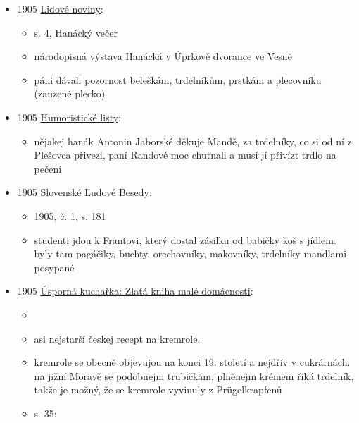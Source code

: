 \begin{itemize}
  \begin{itemize}
  \tightlist
  \item
    etiketa přikazuje matkám, sestrám, kmotrám, tetám, ale můžou i
    kamarádky, nosit šestinedělkám do kouta: 1. zásilka bývá vařená
    slepice, lukšová polívka, koláče, 2. lukšová polívka, hovězí s
    omáčkou, koblihy, víno, 3. smažený kuřata, trdelník nebo boží
    milosti a víno, 4. živá drůbež, syrová káva, bábovka i syrový maso
  \end{itemize}
\item
  1905
  \href{https://ceskadigitalniknihovna.cz/uuid/uuid:b78503e3-435d-11dd-b505-00145e5790ea}{Lidové
  noviny}:

  \begin{itemize}
  \tightlist
  \item
    s. 4, Hanácký večer
  \item
    národopisná výstava Hanácká v Úprkově dvorance ve Vesně
  \item
    páni dávali pozornost beleškám, trdelníkům, prstkám a plecovníku
    (zauzené plecko)
  \end{itemize}
\item
  1905
  \href{https://ceskadigitalniknihovna.cz/uuid/uuid:e6cc2207-435d-11dd-b505-00145e5790ea}{Humoristické
  listy}:

  \begin{itemize}
  \tightlist
  \item
    nějakej hanák Antonin Jaborské děkuje Mandě, za trdelníky, co si od
    ní z Plešovca přivezl, paní Randové moc chutnali a musí jí přivízt
    trdlo na pečení
  \end{itemize}
\item
  1905
  \href{https://dikda.snk.sk/uuid/uuid:f4689941-92c2-4efa-b830-9c02c5e1dbf7}{Slovenské
  Ľudové Besedy}:

  \begin{itemize}
  \tightlist
  \item
    1905, č. 1, s. 181
  \item
    studenti jdou k Frantovi, který dostal zásilku od babičky koš s
    jídlem. byly tam pagáčiky, buchty, orechovníky, makovníky, trdelníky
    mandlami posypané
  \end{itemize}
\item
  1905
  \href{https://ceskadigitalniknihovna.cz/uuid/uuid:92266300-0c11-11ed-9dda-5ef3fc9bb22f}{Úsporná
  kuchařka: Zlatá kniha malé domácnosti}:

  \begin{itemize}
  \tightlist
  \item
  \item
    asi nejstarší českej recept na kremrole.
  \item
    kremrole se obecně objevujou na konci 19. století a nejdřív v
    cukrárnách. na jižní Moravě se podobnejm trubičkám, plněnejm krémem
    řiká trdelník, takže je možný, že se kremrole vyvinuly z
    Prügelkrapfenů
  \item
    s. 35:


\end{itemize}
\end{itemize}
